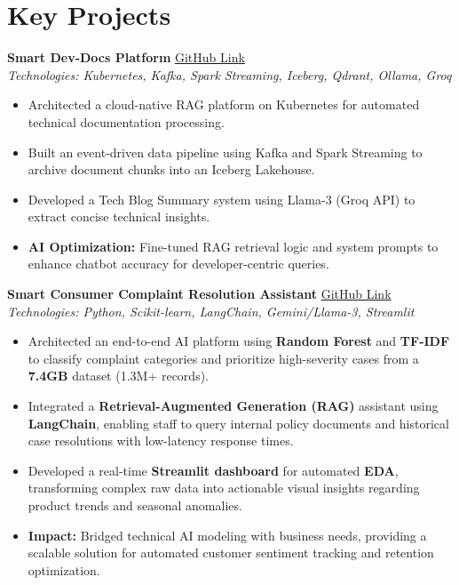 \documentclass[a4paper,10pt]{article}
\begin{document}
\section{Key Projects}

\textbf{Smart Dev-Docs Platform} \hfill \href{https://github.com/BlueWhaleo5/Smart_Dev_Cloud_Native}{GitHub Link} \\
\textit{Technologies: Kubernetes, Kafka, Spark Streaming, Iceberg, Qdrant, Ollama, Groq}
\begin{itemize}
    \item Architected a cloud-native RAG platform on Kubernetes for automated technical documentation processing.
    \item Built an event-driven data pipeline using Kafka and Spark Streaming to archive document chunks into an Iceberg Lakehouse.
    \item Developed a Tech Blog Summary system using Llama-3 (Groq API) to extract concise technical insights.
    \item \textbf{AI Optimization:} Fine-tuned RAG retrieval logic and system prompts to enhance chatbot accuracy for developer-centric queries.
\end{itemize}

\textbf{Smart Consumer Complaint Resolution Assistant} \hfill \href{https://github.com/BlueWhaleo5/Smart-Consumer-Complaint-Resolution-Assistant}{GitHub Link} \\
\textit{Technologies: Python, Scikit-learn, LangChain, Gemini/Llama-3, Streamlit}
\begin{itemize}
    \item Architected an end-to-end AI platform using \textbf{Random Forest} and \textbf{TF-IDF} to classify complaint categories and prioritize high-severity cases from a \textbf{7.4GB} dataset (1.3M+ records).
    \item Integrated a \textbf{Retrieval-Augmented Generation (RAG)} assistant using \textbf{LangChain}, enabling staff to query internal policy documents and historical case resolutions with low-latency response times.
    \item Developed a real-time \textbf{Streamlit dashboard} for automated \textbf{EDA}, transforming complex raw data into actionable visual insights regarding product trends and seasonal anomalies.
    \item \textbf{Impact:} Bridged technical AI modeling with business needs, providing a scalable solution for automated customer sentiment tracking and retention optimization.
\end{itemize}
\end{document}
